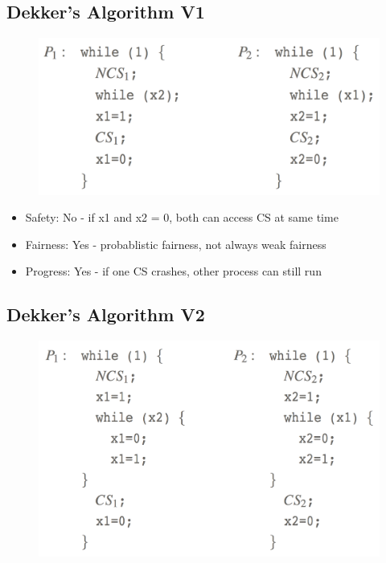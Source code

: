 \documentclass{hw}
\begin{document}
\subsection{Dekker's Algorithm V1}
\begin{figure}[H]
  \centering
  \includegraphics[scale=.4]{dekker1}
\end{figure}

\begin{itemize}
  \item Safety:    No - if x1 and x2 = 0, both can access CS at same time   
  \item Fairness:  Yes  - probablistic fairness, not always weak fairness 
  \item Progress:  Yes - if one CS crashes, other process can still run     
\end{itemize}

\subsection{Dekker's Algorithm V2}
\begin{figure}[H]
  \centering
  \includegraphics[scale=.4]{dekker2}
\end{figure}
                                                                        
\end{document}
